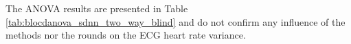 The ANOVA results are presented in Table \ref{tab:blocdanova_sdnn_two_way_blind} and do not confirm any influence of the methods nor the rounds on the ECG heart rate variance.




